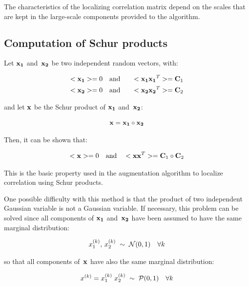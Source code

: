 \documentclass[11pt]{article}
\begin{document}
\noindent
The characteristics of the localizing correlation matrix
depend on the scales that are kept in the large-scale components
provided to the algorithm.

\subsection{Computation of Schur products}

Let ${\bf x_1}$ and~${\bf x_2}$ be two independent random vectors, with:

\begin{eqnarray}
\label{eq:defx1}
<{\bf x_1}> = 0 \quad&\mbox{and}&\quad <{\bf x_1}{\bf x_1}^T> = {\bf C}_1 \\
\label{eq:defx2}
<{\bf x_2}> = 0 \quad&\mbox{and}&\quad <{\bf x_2}{\bf x_2}^T> = {\bf C}_2
\end{eqnarray}

\noindent
and let ${\bf x}$ be the Schur product of ${\bf x_1}$ and~${\bf x_2}$:

\begin{equation}
\label{eq:product}
{\bf x} = {\bf x_1} \circ {\bf x_2}
\end{equation}

\noindent
Then, it can be shown that:

\begin{equation}
\label{eq:x-cov}
<{\bf x}> = 0 \quad\mbox{and}\quad <{\bf x}{\bf x}^T> = {\bf C}_1 \circ {\bf C}_2 \\
\end{equation}

\noindent
This is the basic property used in the augmentation algorithm
to localize correlation using Schur products.

One possible difficulty with this method is that the product
of two independent Gaussian variable is not a Gaussian variable.
If necessary, this problem can be solved since all components
of ${\bf x_1}$ and~${\bf x_2}$ have been assumed to have the same marginal distribution:

\begin{equation}
x_1^{(k)},\, x_2^{(k)} \; \sim \; {\cal N} (0,1) \quad \forall k
\end{equation}

\noindent
so that all components of~${\bf x}$ have also the same marginal distribution:

\begin{equation}
x^{(k)} = x_1^{(k)} \; x_2^{(k)} \; \sim \; {\cal P} (0,1) \quad \forall k
\end{equation}
\end{document}
